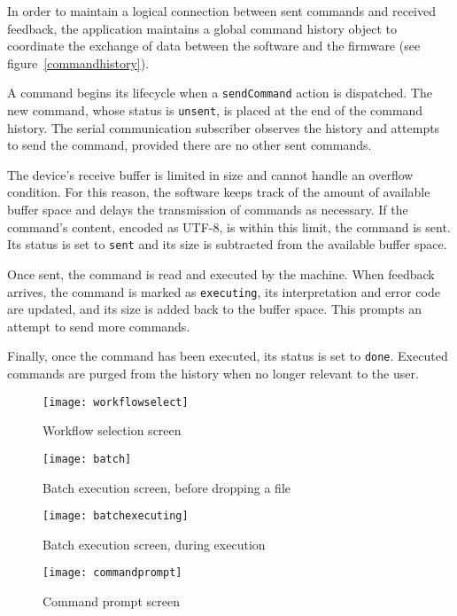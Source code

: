 In order to maintain a logical connection between sent commands and received
feedback, the application maintains a global command history object to
coordinate the exchange of data between the software and the firmware
(see figure~\ref{commandhistory}).

A command begins its lifecycle when a \texttt{sendCommand} action is dispatched.
The new command, whose status is \texttt{unsent}, is placed at the end of the
command history. The serial communication subscriber observes the history and
attempts to send the command, provided there are no other sent commands.

The device's receive buffer is limited in size and cannot handle an overflow
condition. For this reason, the software keeps track of the amount of available
buffer space and delays the transmission of commands as necessary. If the
command's content, encoded as UTF-8, is within this limit, the command is sent.
Its status is set to \texttt{sent} and its size is subtracted from the
available buffer space.

Once sent, the command is read and executed by the machine. When feedback
arrives, the command is marked as \texttt{executing}, its interpretation and
error code are updated, and its size is added back to the buffer space.
This prompts an attempt to send more commands.

Finally, once the command has been executed, its status is set to \texttt{done}.
Executed commands are purged from the history when no longer relevant to the
user.

\clearpage
\begin{figure}[ht]
    \begin{center}
        \texttt{[image: workflowselect]}
        \caption{Workflow selection screen}
        \label{workflow}
    \end{center}
\end{figure}
\begin{figure}[ht!]
    \begin{center}
        \texttt{[image: batch]}
        \caption{Batch execution screen, before dropping a file}
    \end{center}
\end{figure}

\clearpage
\begin{figure}[ht]
    \begin{center}
        \texttt{[image: batchexecuting]}
        \caption{Batch execution screen, during execution}
        \label{batch}
    \end{center}
\end{figure}
\begin{figure}[ht!]
    \begin{center}
        \texttt{[image: commandprompt]}
        \caption{Command prompt screen}
        \label{commandprompt}
    \end{center}
\end{figure}

